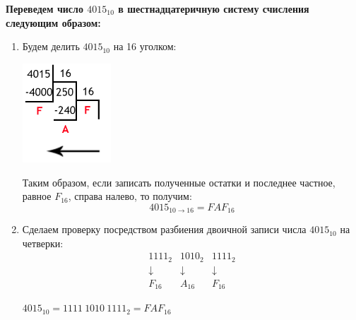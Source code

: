 \documentclass[12pt]{article}
\begin{document}
	\textbf{Переведем число $4015_{10}$ в шестнадцатеричную систему счисления следующим образом:}
	\begin{enumerate}
		\item Будем делить $4015_{10}$ на 16 уголком: 
		
		\begin{center}
			\includegraphics[width=125px]{angle16}
		\end{center}
		
		Таким образом, если записать полученные остатки и последнее частное, равное $F_{16}$, справа налево, то получим: $$4015_{10 \to 16} = FAF_{16}$$
		
		\item Сделаем проверку посредством разбиения двоичной записи числа $4015_{10}$ на четверки:
		$$
		\begin{array}{cccc}
			1111_2 & 1010_2 & 1111_2\\
			\downarrow & \downarrow & \downarrow \\
			F_{16} & A_{16} & F_{16}
		\end{array}
		$$
		
		$4015_{10} = 1111\:1010\:1111_2 = FAF_{16}$
	\end{enumerate}
	
	\newpage
	
	
\end{document}
